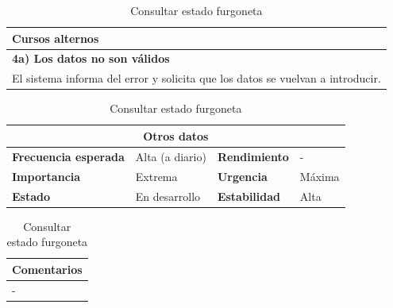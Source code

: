 \documentclass[12pt,spanish]{article}
\begin{document}
\begin{table}[H]
\vspace{1cm}

\begin{tabular}{|m{10pt}|m{7.15cm}|m{10pt}|m{7.15cm}|}
\hline
\multicolumn{4}{|m{16.2cm}|}{\textbf{Cursos alternos}} \\
\hline
\multicolumn{4}{|m{16.2cm}|}{\textbf{4a) Los datos no son válidos}} \\
\hline
\multicolumn{4}{|m{16.2cm}|}{El sistema informa del error y solicita que los datos se vuelvan a introducir.} \\
\hline
\end{tabular}

\vspace{1cm}

\begin{tabular}{|m{3.72cm}|m{3.72cm}|m{3.72cm}|m{3.72cm}|}
\hline
\multicolumn{4}{|c|}{\textbf{Otros datos}} \\
\hline
\textbf{Frecuencia esperada} & Alta (a diario) & \textbf{Rendimiento} & - \\
\hline
\textbf{Importancia} & Extrema & \textbf{Urgencia} & Máxima \\
\hline
\textbf{Estado} & En desarrollo & \textbf{Estabilidad} & Alta \\
\hline
\end{tabular}

\vspace{1cm}

\begin{tabular}{|m{16.2cm}|}
\hline
\textbf{Comentarios} \\
\hline
- \\
\hline
\end{tabular}

\caption{Consultar estado furgoneta}

\end{table}



\end{document}
